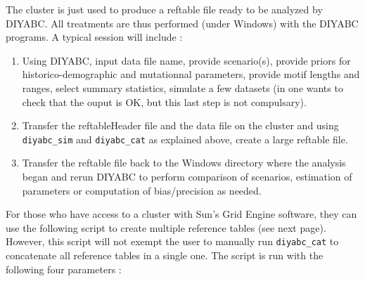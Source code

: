  The cluster is just used to produce a reftable file ready to be analyzed by DIYABC. All treatments are thus performed (under Windows) with the DIYABC programs. A typical session will include :\\
  \begin{enumerate}
  \item Using DIYABC, input data file name, provide scenario(s), provide priors for historico-demographic and mutationnal parameters, provide motif lengths and ranges, select summary statistics, simulate a few datasets (in one wants to check that the ouput is OK, but this last step is not compulsary). 
  \item Transfer the reftableHeader file and the data file on the cluster and using \texttt{diyabc\_sim} and \texttt{diyabc\_cat} as explained above, create a large reftable file.
  \item Transfer the reftable file back to the Windows directory where the analysis began and rerun DIYABC to perform comparison of scenarios, estimation of parameters or computation of bias/precision as needed.  
  \end{enumerate}
  For those who have access to a cluster with Sun's Grid Engine software, they can use the following script to create multiple reference tables (see next page). However, this script will not exempt the user to  manually run \texttt{diyabc\_cat} to concatenate all reference tables in a single one. The script is run with the following four parameters :\\
  
